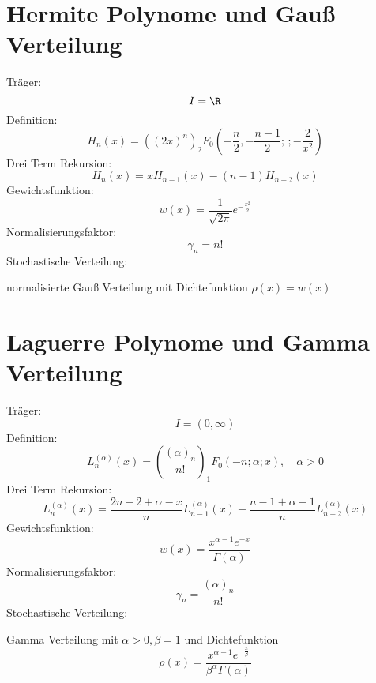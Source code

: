 \section{Hermite Polynome und Gauß Verteilung}
Träger:
\[I=\R\]
Definition:
\[H_n(x)=\left((2x)^n\right)_2 F_0\left(-\frac{n}{2},-\frac{n-1}{2};\, ;-\frac{2}{x^2}\right)\]
Drei Term Rekursion:
\[H_{n}(x)=xH_{n-1}(x)-(n-1)H_{n-2}(x)\]
Gewichtsfunktion:
\[w(x)=\frac{1}{\sqrt{2\pi}}e^{-\frac{x^2}{2}}\]
Normalisierungsfaktor:
\[\gamma_n=n!\]
Stochastische Verteilung:
\begin{center}
normalisierte Gauß Verteilung mit Dichtefunktion $\rho(x)=w(x)$
\end{center}

\section{Laguerre Polynome und Gamma Verteilung}
Träger:
\[I=(0,\infty)\]
Definition:
\[L_n^{(\alpha)}(x)=\left(\frac{(\alpha)_n}{n!}\right)_1 F_0\left(-n;\alpha;x\right),\quad \alpha>0\]
Drei Term Rekursion:
\[L_{n}^{(\alpha)}(x)=\frac{2n-2+\alpha -x}{n}L_{n-1}^{(\alpha)}(x)-\frac{n-1+\alpha - 1}{n}L_{n-2}^{(\alpha)}(x)\]
Gewichtsfunktion:
\[w(x)=\frac{x^{\alpha-1}e^{-x}}{\Gamma(\alpha)}\]
Normalisierungsfaktor:
\[\gamma_n=\frac{(\alpha)_n}{n!}\]
Stochastische Verteilung:
\begin{center}
Gamma Verteilung mit $\alpha>0,\beta=1$ und Dichtefunktion
\[\rho(x)=\frac{x^{\alpha-1}e^{-\frac{x}{\beta}}}{\beta^{\alpha}\Gamma(\alpha)}\]
\end{center}

